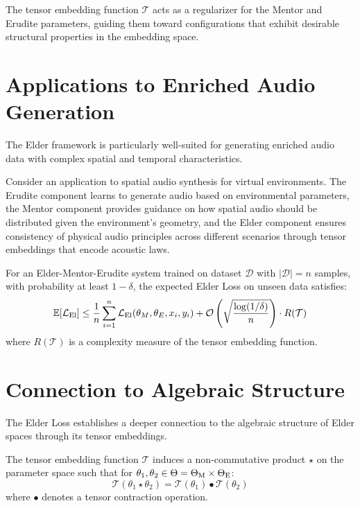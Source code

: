 \begin{corollary}
The tensor embedding function $\mathcal{T}$ acts as a regularizer for the Mentor and Erudite parameters, guiding them toward configurations that exhibit desirable structural properties in the embedding space.
\end{corollary}

\section{Applications to Enriched Audio Generation}

The Elder framework is particularly well-suited for generating enriched audio data with complex spatial and temporal characteristics.

\begin{example}
Consider an application to spatial audio synthesis for virtual environments. The Erudite component learns to generate audio based on environmental parameters, the Mentor component provides guidance on how spatial audio should be distributed given the environment's geometry, and the Elder component ensures consistency of physical audio principles across different scenarios through tensor embeddings that encode acoustic laws.
\end{example}

\begin{theorem}
For an Elder-Mentor-Erudite system trained on dataset $\mathcal{D}$ with $|\mathcal{D}| = n$ samples, with probability at least $1-\delta$, the expected Elder Loss on unseen data satisfies:
\begin{equation}
\mathbb{E}[\mathcal{L}_{\text{El}}] \leq \frac{1}{n}\sum_{i=1}^n \mathcal{L}_{\text{El}}(\theta_M, \theta_E, x_i, y_i) + \mathcal{O}\left(\sqrt{\frac{\log(1/\delta)}{n}}\right) \cdot R(\mathcal{T})
\end{equation}
where $R(\mathcal{T})$ is a complexity measure of the tensor embedding function.
\end{theorem}

\section{Connection to Algebraic Structure}

The Elder Loss establishes a deeper connection to the algebraic structure of Elder spaces through its tensor embeddings.

\begin{proposition}
The tensor embedding function $\mathcal{T}$ induces a non-commutative product $\star$ on the parameter space such that for $\theta_1, \theta_2 \in \Theta = \Theta_{\text{M}} \times \Theta_{\text{E}}$:
\begin{equation}
\mathcal{T}(\theta_1 \star \theta_2) = \mathcal{T}(\theta_1) \bullet \mathcal{T}(\theta_2)
\end{equation}
where $\bullet$ denotes a tensor contraction operation.
\end{proposition}

